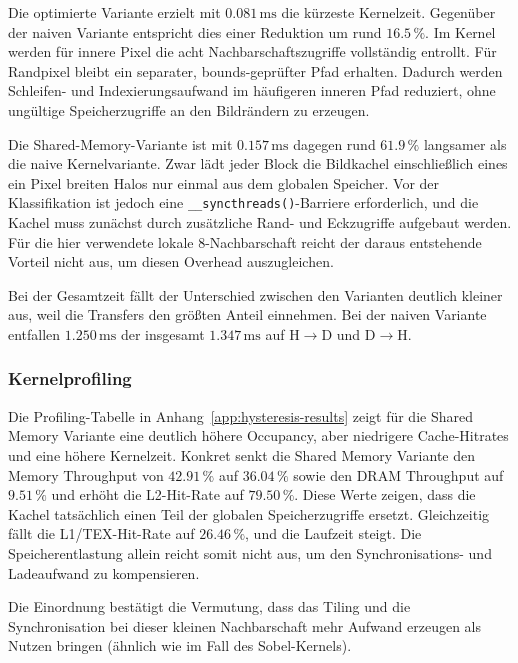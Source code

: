 Die optimierte Variante erzielt mit $0.081\,\mathrm{ms}$ die kürzeste
Kernelzeit. Gegenüber der naiven Variante entspricht dies einer Reduktion um
rund $16.5\,\%$. Im Kernel werden für innere Pixel die acht
Nachbarschaftszugriffe vollständig entrollt. Für Randpixel bleibt ein
separater, bounds-geprüfter Pfad erhalten. Dadurch werden Schleifen- und
Indexierungsaufwand im häufigeren inneren Pfad reduziert, ohne ungültige
Speicherzugriffe an den Bildrändern zu erzeugen.

Die Shared-Memory-Variante ist mit $0.157\,\mathrm{ms}$ dagegen rund
$61.9\,\%$ langsamer als die naive Kernelvariante. Zwar lädt jeder Block die
Bildkachel einschließlich eines ein Pixel breiten Halos nur einmal aus dem
globalen Speicher. Vor der Klassifikation ist jedoch eine
\texttt{\_\_syncthreads()}-Barriere erforderlich, und die Kachel muss zunächst
durch zusätzliche Rand- und Eckzugriffe aufgebaut werden. Für die hier
verwendete lokale 8-Nachbarschaft reicht der daraus entstehende Vorteil nicht
aus, um diesen Overhead auszugleichen.

Bei der Gesamtzeit fällt der Unterschied zwischen den Varianten deutlich
kleiner aus, weil die Transfers den größten Anteil einnehmen. Bei der naiven
Variante entfallen $1.250\,\mathrm{ms}$ der insgesamt $1.347\,\mathrm{ms}$ auf
H$\to$D und D$\to$H.

\subsubsection{Kernelprofiling}

Die Profiling-Tabelle in Anhang~\ref{app:hysteresis-results} zeigt für die
Shared Memory Variante eine deutlich höhere Occupancy, aber niedrigere
Cache-Hitrates und eine höhere Kernelzeit. Konkret senkt die Shared Memory Variante den Memory Throughput von $42.91\,\%$ auf $36.04\,\%$ sowie den DRAM
Throughput auf $9.51\,\%$ und erhöht die L2-Hit-Rate auf
$79.50\,\%$. Diese Werte zeigen, dass die Kachel tatsächlich einen Teil der
globalen Speicherzugriffe ersetzt. Gleichzeitig fällt die L1/TEX-Hit-Rate
auf $26.46\,\%$, und die Laufzeit steigt. Die Speicherentlastung allein
reicht somit nicht aus, um den Synchronisations- und Ladeaufwand zu
kompensieren.

Die Einordnung bestätigt die Vermutung, dass das Tiling und die Synchronisation bei dieser kleinen Nachbarschaft mehr Aufwand erzeugen als Nutzen bringen (ähnlich wie im Fall des Sobel-Kernels).

